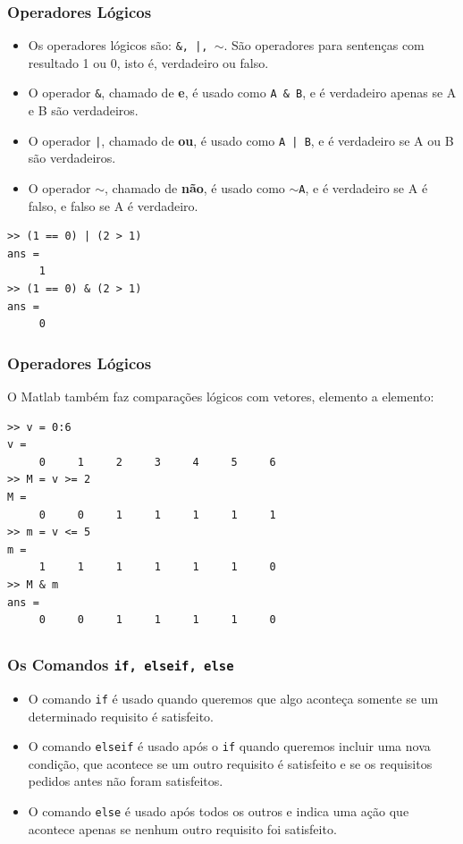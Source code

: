 \documentclass{beamer}
\begin{document}
\begin{frame}[fragile]
\frametitle{Operadores L\'ogicos}

\begin{itemize}
\item<1->Os operadores l\'ogicos s\~ao: {\tt \&, |, $\sim$}. S\~ao operadores para senten\c{c}as com resultado 1 ou 0, isto \'e, verdadeiro ou falso.
\item<2->O operador {\tt \&}, chamado de {\bf e}, \'e usado como \verb+A & B+, e \'e verdadeiro apenas se A e B s\~ao verdadeiros.
\item<3->O operador {\tt |}, chamado de {\bf ou}, \'e usado como \verb+A | B+, e \'e verdadeiro se A ou B s\~ao verdadeiros.
\item<4->O operador $\sim$, chamado de {\bf n\~ao}, \'e usado como {\tt $\sim$A}, e \'e verdadeiro se A \'e falso, e falso se A \'e verdadeiro.
\end{itemize}
\pause \pause \pause \pause
{\scriptsize
\begin{verbatim}
>> (1 == 0) | (2 > 1)
ans =
     1
>> (1 == 0) & (2 > 1)
ans =
     0
\end{verbatim}}
\end{frame}

\begin{frame}[fragile]
\frametitle{Operadores L\'ogicos}

O Matlab tamb\'em faz compara\c{c}\~oes l\'ogicos com vetores, elemento a elemento:
{\small
\begin{verbatim}
>> v = 0:6
v = 
     0     1     2     3     4     5     6
>> M = v >= 2
M =
     0     0     1     1     1     1     1
>> m = v <= 5
m =
     1     1     1     1     1     1     0
>> M & m
ans =
     0     0     1     1     1     1     0
\end{verbatim}
}
\end{frame}

\subsection[Os Comandos if, elseif, else]{}

\begin{frame}[fragile]
\frametitle{Os Comandos {\tt if, elseif, else}}

\begin{itemize}
\item<1-> O comando {\tt if} \'e usado quando queremos que algo aconte\c{c}a somente se um determinado requisito \'e satisfeito.
\item<2-> O comando {\tt elseif} \'e usado ap\'os o {\tt if} quando queremos incluir uma nova condi\c{c}\~ao, que acontece se um outro requisito \'e satisfeito e se os requisitos pedidos antes n\~ao foram satisfeitos.
\item<3-> O comando {\tt else} \'e usado ap\'os todos os outros e indica uma a\c{c}\~ao que acontece apenas se nenhum outro requisito foi satisfeito.
\end{itemize}

\end{frame}
\end{document}
